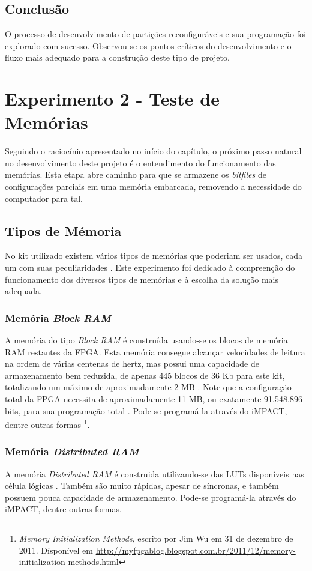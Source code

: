 \documentclass[11pt,a4paper,oneside]{book}
\begin{document}
\subsection{Conclusão}
O processo de desenvolvimento de partições reconfiguráveis e sua programação foi explorado com sucesso.
Observou-se os pontos críticos do desenvolvimento e o fluxo mais adequado para a construção deste tipo de projeto.

\section{Experimento 2 - Teste de Memórias}
Seguindo o raciocínio apresentado no início do capítulo, o próximo passo natural no desenvolvimento deste projeto é o entendimento do funcionamento das memórias.
Esta etapa abre caminho para que se armazene os \textit{bitfiles} de configurações parciais em uma memória embarcada, removendo a necessidade do computador para tal.

\subsection{Tipos de Mémoria}

No kit utilizado existem vários tipos de memórias que poderiam ser usados, cada um com suas peculiaridades \cite{ug810}.
Este experimento foi dedicado à compreenção do funcionamento dos diversos tipos de memórias e à escolha da solução mais adequada.

\subsubsection{Memória \textit{Block RAM}}
A memória do tipo \textit{Block RAM} é construída usando-se os blocos de memória RAM restantes da FPGA.
Esta memória consegue alcançar velocidades de leitura na ordem de várias centenas de hertz, mas possui uma capacidade de armazenamento bem reduzida, de apenas 445 blocos de 36 Kb para este kit, totalizando um máximo de aproximadamente 2 MB \cite{ug473, wp377}.
Note que a configuração total da FPGA necessita de aproximadamente 11 MB, ou exatamente 91.548.896 bits, para sua programação total \cite{ug470}.
Pode-se programá-la através do iMPACT, dentre outras formas \footnote{\textit{Memory Initialization Methods}, escrito por Jim Wu em 31 de dezembro de 2011. Dísponível em \url{http://myfpgablog.blogspot.com.br/2011/12/memory-initialization-methods.html}}.

\subsubsection{Memória \textit{Distributed RAM}}
A memória \textit{Distributed RAM} é construida utilizando-se das LUTs disponíveis nas célula lógicas \cite{ug473, wp377}.
Também são muito rápidas, apesar de síncronas, e também possuem pouca capacidade de armazenamento.
Pode-se programá-la através do iMPACT, dentre outras formas.
\end{document}
